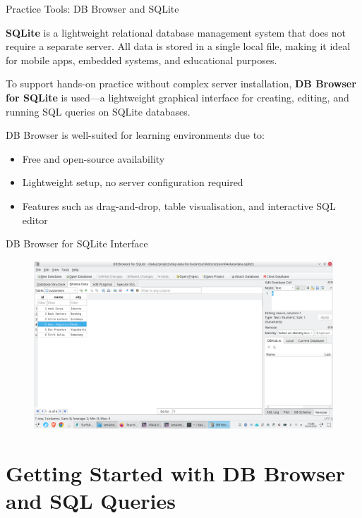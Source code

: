 \documentclass[aspectratio=169, table]{beamer}
\begin{document}
\begin{frame}{Practice Tools: DB Browser and SQLite}
\vspace{20pt}

\textbf{SQLite} is a lightweight relational database management system that does not require a separate server. All data is stored in a single local file, making it ideal for mobile apps, embedded systems, and educational purposes.

\vspace{10pt}
To support hands-on practice without complex server installation, \textbf{DB Browser for SQLite} is used—a lightweight graphical interface for creating, editing, and running SQL queries on SQLite databases.

\vspace{10pt}
DB Browser is well-suited for learning environments due to:
\begin{itemize}
\item Free and open-source availability
\item Lightweight setup, no server configuration required
\item Features such as drag-and-drop, table visualisation, and interactive SQL editor
\end{itemize}

\end{frame}

\begin{frame}{DB Browser for SQLite Interface}
\vspace{20pt}

\begin{figure}
\centering
\includegraphics[width=.8\textwidth]{../../figures/dbbrowser.png}
\label{fig:dbbrowser}
\end{figure}

\end{frame}



\section{Getting Started with DB Browser and SQL Queries}
\end{document}
